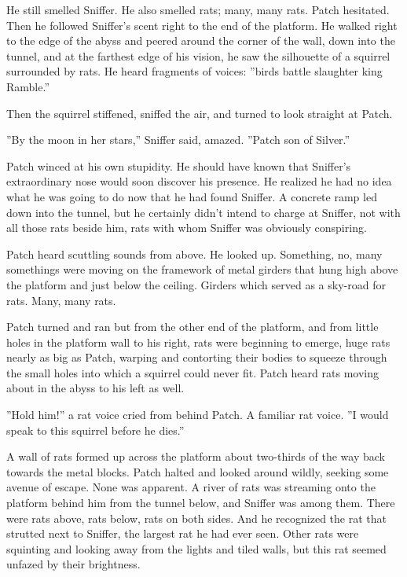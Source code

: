 \documentclass[12pt]{book}
\begin{document}
He still smelled Sniffer. He also smelled rats; many, many rats. Patch hesitated. Then he followed Sniffer's scent right to the end of the platform. He walked right to the edge of the abyss and peered around the corner of the wall, down into the tunnel, and at the farthest edge of his vision, he saw the silhouette of a squirrel surrounded by rats. He heard fragments of voices: ''birds%
battle%
slaughter%
king%
Ramble.''

Then the squirrel stiffened, sniffed the air, and turned to look straight at Patch.

''By the moon in her stars,'' Sniffer said, amazed. ''Patch son of Silver.''

Patch winced at his own stupidity. He should have known that Sniffer's extraordinary nose would soon discover his presence. He realized he had no idea what he was going to do now that he had found Sniffer. A concrete ramp led down into the tunnel, but he certainly didn't intend to charge at Sniffer, not with all those rats beside him, rats with whom Sniffer was obviously conspiring.

Patch heard scuttling sounds from above. He looked up. Something, no, many somethings were moving on the framework of metal girders that hung high above the platform and just below the ceiling. Girders which served as a sky-road for rats. Many, many rats.

Patch turned and ran %
but from the other end of the platform, and from little holes in the platform wall to his right, rats were beginning to emerge, huge rats nearly as big as Patch, warping and contorting their bodies to squeeze through the small holes into which a squirrel could never fit. Patch heard rats moving about in the abyss to his left as well.

''Hold him!'' a rat voice cried from behind Patch. A familiar rat voice. ''I would speak to this squirrel before he dies.''

A wall of rats formed up across the platform about two-thirds of the way back towards the metal blocks. Patch halted and looked around wildly, seeking some avenue of escape. None was apparent. A river of rats was streaming onto the platform behind him from the tunnel below, and Sniffer was among them. There were rats above, rats below, rats on both sides. And he recognized the rat that strutted next to Sniffer, the largest rat he had ever seen. Other rats were squinting and looking away from the lights and tiled walls, but this rat seemed unfazed by their brightness.
\end{document}
